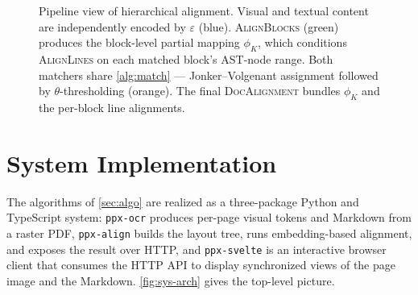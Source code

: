 \documentclass{article}
\theoremstyle{definition}
\begin{document}
\begin{figure}[h]
\begin{tikzpicture}
      \end{tikzpicture}
      \caption{Pipeline view of hierarchical alignment.  Visual and textual
            content are independently encoded by $\varepsilon$ (blue).
            \textsc{AlignBlocks} (green) produces the block-level partial
            mapping $\phi_K$, which conditions \textsc{AlignLines} on each
            matched block's AST-node range.  Both matchers share
            \cref{alg:match} --- Jonker--Volgenant assignment followed by
            $\theta$-thresholding (orange).  The final \textsc{DocAlignment}
            bundles $\phi_K$ and the per-block line alignments.}
      \label{fig:pipeline}
      \vspace{0.2em}
\end{figure}

\section{System Implementation}
\label{sec:impl}

The algorithms of \cref{sec:algo} are realized as a three-package Python
and TypeScript system: \texttt{ppx-ocr} produces per-page visual tokens
and Markdown from a raster PDF, \texttt{ppx-align} builds the layout tree,
runs embedding-based alignment, and exposes the result over HTTP, and
\texttt{ppx-svelte} is an interactive browser client that consumes the
HTTP API to display synchronized views of the page image and the
Markdown.  \cref{fig:sys-arch} gives the top-level picture.
\end{document}
